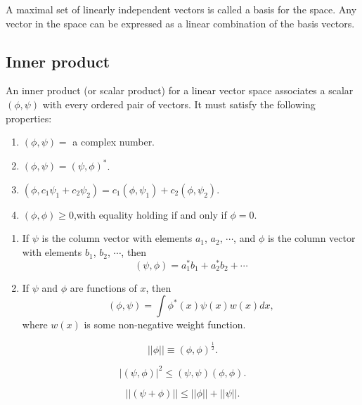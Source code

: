 \begin{newdef}[Base]
A maximal set of linearly independent vectors is called a basis for the space. Any vector in the space can be expressed as a linear combination of the basis vectors.
\end{newdef}

\subsection{Inner product}
\begin{newdef}
An inner product (or scalar product) for a linear vector space associates a scalar $(\phi,\psi)$ with every ordered pair of vectors. 
It must satisfy the following properties:
\begin{enumerate}
\item $(\phi,\psi) = $ a complex number.
\item $(\phi,\psi) = (\psi,\phi)^*$.
\item $(\phi,c_1\psi_1 + c_2\psi_2) = c_1(\phi,\psi_1) + c_2(\phi,\psi_2)$.
\item $(\phi,\phi) \geq 0$,with equality holding if and only if $\phi=0$.
\end{enumerate}
\end{newdef}

\begin{example}
\begin{enumerate}
\item If $\psi$ is the column vector with elements $a_1$, $a_2$, $\cdots$, and $\phi$ is the column vector with elements $b_1$, $b_2$, $\cdots$, then
\[(\psi,\phi) = a_1^*b_1 + a_2^*b_2 + \cdots\]
\item If $\psi$ and $\phi$ are functions of $x$, then
\[(\phi,\psi) = \int \phi^*(x) \psi(x) w(x) dx,\]
where $w(x)$ is some non-negative weight function.
\end{enumerate}
\end{example}

\begin{newdef}[Norm]
\[|| \phi || \equiv (\phi,\phi)^{\frac{1}{2}}.\]
\end{newdef}

\begin{newthem}
\[|(\psi,\phi)|^2 \leq (\psi,\psi)(\phi,\phi).\]
\end{newthem}

\begin{newthem}
\[||(\psi+\phi)|| \leq ||\phi|| + ||\psi||.\]
\end{newthem}

